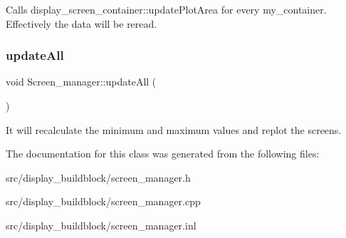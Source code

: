 Calls display\+\_\+screen\+\_\+container\+::update\+Plot\+Area for every my\+\_\+container. Effectively the data will be reread. \mbox{\label{classScreen__manager_afc206ddd1fee12c08d890d7a0c4c5fcb}} 
\subsubsection{\texorpdfstring{update\+All}{updateAll}}
{\footnotesize\ttfamily void Screen\+\_\+manager\+::update\+All (\begin{DoxyParamCaption}{ }\end{DoxyParamCaption})\hspace{0.3cm}{\ttfamily [slot]}}

It will recalculate the minimum and maximum values and replot the screens. 

The documentation for this class was generated from the following files\+:\begin{DoxyCompactItemize}
\item 
src/display\+\_\+buildblock/screen\+\_\+manager.\+h\item 
src/display\+\_\+buildblock/screen\+\_\+manager.\+cpp\item 
src/display\+\_\+buildblock/screen\+\_\+manager.\+inl\end{DoxyCompactItemize}
